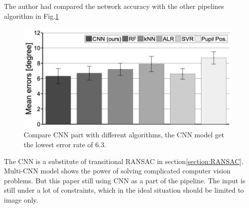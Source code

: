 \documentclass[senior]{IPSstyle}
\begin{document}
The author had compared the network accuracy with the other pipelines algorithm in Fig.\ref{fig:compare}
\begin{figure}
    \centering
    \includegraphics[scale=1.4]{MasterThesis-master/images/csm_MPIIGaze_within_MPII_dataset.png}
    \caption{Compare CNN part with different algorithms, the CNN model get the lowest error rate of 6.3.}
    \label{fig:compare}
\end{figure}
The CNN is a substitute of transitional RANSAC in section\ref{section:RANSAC}.
Multi-CNN model shows the power of solving complicated computer vision problems.
But this paper still using CNN as a part of the pipeline.
The input is still under a lot of constraints, which in the ideal situation should be limited to image only.
\end{document}
